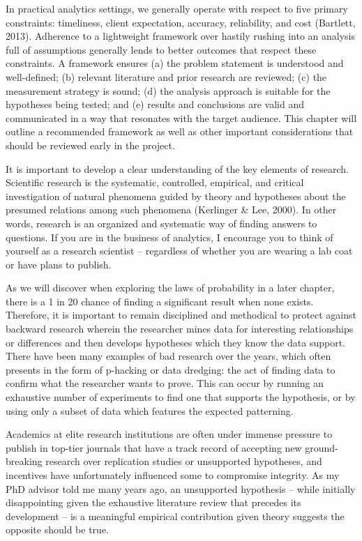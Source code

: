 \documentclass[
]{book}
\begin{document}
In practical analytics settings, we generally operate with respect to five primary constraints: timeliness, client expectation, accuracy, reliability, and cost (Bartlett, 2013). Adherence to a lightweight framework over hastily rushing into an analysis full of assumptions generally lends to better outcomes that respect these constraints. A framework ensures (a) the problem statement is understood and well-defined; (b) relevant literature and prior research are reviewed; (c) the measurement strategy is sound; (d) the analysis approach is suitable for the hypotheses being tested; and (e) results and conclusions are valid and communicated in a way that resonates with the target audience. This chapter will outline a recommended framework as well as other important considerations that should be reviewed early in the project.

It is important to develop a clear understanding of the key elements of research. Scientific research is the systematic, controlled, empirical, and critical investigation of natural phenomena guided by theory and hypotheses about the presumed relations among such phenomena (Kerlinger \& Lee, 2000). In other words, research is an organized and systematic way of finding answers to questions. If you are in the business of analytics, I encourage you to think of yourself as a research scientist -- regardless of whether you are wearing a lab coat or have plans to publish.

As we will discover when exploring the laws of probability in a later chapter, there is a 1 in 20 chance of finding a significant result when none exists. Therefore, it is important to remain disciplined and methodical to protect against backward research wherein the researcher mines data for interesting relationships or differences and then develops hypotheses which they know the data support. There have been many examples of bad research over the years, which often presents in the form of p-hacking or data dredging: the act of finding data to confirm what the researcher wants to prove. This can occur by running an exhaustive number of experiments to find one that supports the hypothesis, or by using only a subset of data which features the expected patterning.

Academics at elite research institutions are often under immense pressure to publish in top-tier journals that have a track record of accepting new ground-breaking research over replication studies or unsupported hypotheses, and incentives have unfortunately influenced some to compromise integrity. As my PhD advisor told me many years ago, an unsupported hypothesis -- while initially disappointing given the exhaustive literature review that precedes its development -- is a meaningful empirical contribution given theory suggests the opposite should be true.
\end{document}
